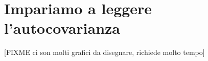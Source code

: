 \section{Impariamo a leggere l'autocovarianza}
\begin{center}
[FIXME ci son molti grafici da disegnare, richiede molto tempo]
\end{center}
